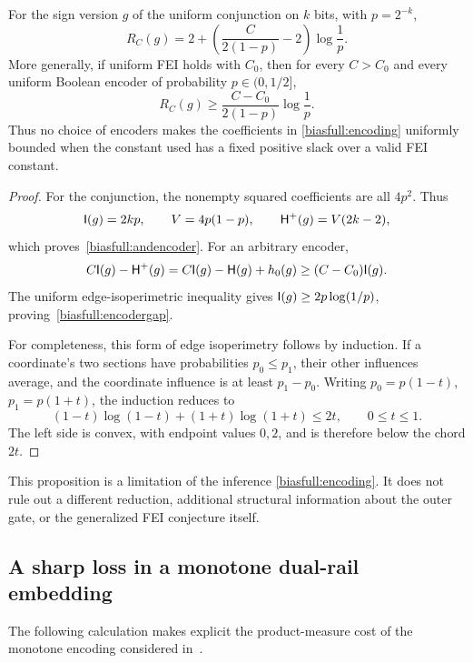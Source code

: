 \begin{proposition}\label{biasfull:encoderslack}
For the sign version \(g\) of the uniform conjunction on \(k\) bits,
with \(p=2^{-k}\),
\begin{equation}\label{biasfull:andencoder}
 R_C(g)=2+\left(\frac{C}{2(1-p)}-2\right)\log\frac1p.
\end{equation}
More generally, if uniform FEI holds with \(C_0\), then for every
\(C>C_0\) and every uniform Boolean encoder of probability
\(p\in(0,1/2]\),
\begin{equation}\label{biasfull:encodergap}
 R_C(g)\ge\frac{C-C_0}{2(1-p)}\log\frac1p.
\end{equation}
Thus no choice of encoders makes the coefficients in
\eqref{biasfull:encoding} uniformly bounded when the constant used
has a fixed positive slack over a valid FEI constant.
\end{proposition}
\begin{proof}
For the conjunction, the nonempty squared coefficients are all
\(4p^2\). Thus
\[
 \mathsf I(g)=2kp,\qquad V=4p(1-p),\qquad
 \mathsf H^+(g)=V(2k-2),
\]
which proves~\eqref{biasfull:andencoder}.
For an arbitrary encoder,
\[
 C\mathsf I(g)-\mathsf H^+(g)
   =C\mathsf I(g)-\mathsf H(g)+h_0(g)\ge(C-C_0)\mathsf I(g).
\]
The uniform edge-isoperimetric inequality gives
\(\mathsf I(g)\ge2p\log(1/p)\), proving~\eqref{biasfull:encodergap}.

For completeness, this form of edge isoperimetry follows by induction.
If a coordinate's two sections have probabilities \(p_0\le p_1\),
their other influences average, and the coordinate influence is at
least \(p_1-p_0\). Writing \(p_0=p(1-t)\), \(p_1=p(1+t)\), the
induction reduces to
\[
 (1-t)\log(1-t)+(1+t)\log(1+t)\le2t,\qquad0\le t\le1.
\]
The left side is convex, with endpoint values \(0,2\), and is
therefore below the chord \(2t\).
\end{proof}

This proposition is a limitation of the inference
\eqref{biasfull:encoding}. It does not rule out a different reduction,
additional structural information about the outer gate, or the
generalized FEI conjecture itself.

\subsection{A sharp loss in a monotone dual-rail embedding}

The following calculation makes explicit the product-measure cost of the monotone encoding considered in~\cite{BrainMonotone}.

